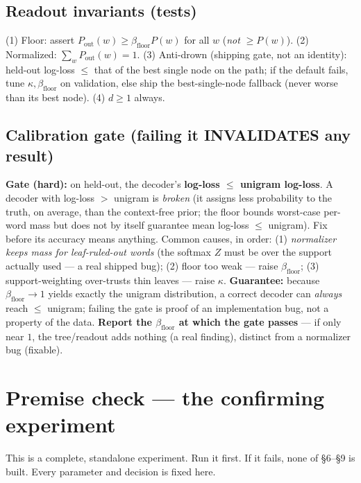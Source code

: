 \documentclass[11pt]{article}
\begin{document}
\subsection{Readout invariants (tests)}
(1) Floor: assert $P_{\text{out}}(w)\ge\beta_{\text{floor}}P(w)$ for all $w$ (\emph{not} $\ge P(w)$). (2) Normalized: $\sum_w P_{\text{out}}(w)=1$. (3) Anti-drown (shipping gate, not an identity): held-out log-loss $\le$ that of the best single node on the path; if the default fails, tune $\kappa,\beta_{\text{floor}}$ on validation, else ship the best-single-node fallback (never worse than its best node). (4) $d\ge1$ always.


\subsection{Calibration gate (failing it INVALIDATES any result)}\label{sec:gate}
\textbf{Gate (hard):} on held-out, the decoder's \textbf{log-loss $\le$ unigram log-loss}. A decoder with log-loss $>$ unigram is \emph{broken} (it assigns less probability to the truth, on average, than the context-free prior; the floor bounds worst-case per-word mass but does not by itself guarantee mean log-loss $\le$ unigram). Fix before its accuracy means anything. Common causes, in order: (1) \emph{normalizer keeps mass for leaf-ruled-out words} (the softmax $Z$ must be over the support actually used --- a real shipped bug); (2) floor too weak --- raise $\beta_{\text{floor}}$; (3) support-weighting over-trusts thin leaves --- raise $\kappa$. \textbf{Guarantee:} because $\beta_{\text{floor}}\to1$ yields exactly the unigram distribution, a correct decoder can \emph{always} reach $\le$ unigram; failing the gate is proof of an implementation bug, not a property of the data. \textbf{Report the $\beta_{\text{floor}}$ at which the gate passes} --- if only near $1$, the tree/readout adds nothing (a real finding), distinct from a normalizer bug (fixable).


\section{Premise check --- the confirming experiment}\label{sec:premise}

This is a complete, standalone experiment. Run it first. If it fails, none of \S6--\S9 is built. Every parameter and decision is fixed here.
\end{document}
